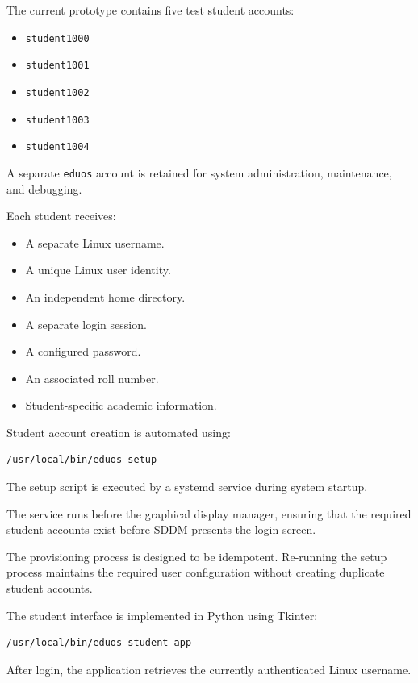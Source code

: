 \documentclass{tietreport}
\begin{document}
The current prototype contains five test student accounts:

\begin{itemize}
    \item \texttt{student1000}
    \item \texttt{student1001}
    \item \texttt{student1002}
    \item \texttt{student1003}
    \item \texttt{student1004}
\end{itemize}

A separate \texttt{eduos} account is retained for system
administration, maintenance, and debugging.

Each student receives:

\begin{itemize}
    \item A separate Linux username.
    \item A unique Linux user identity.
    \item An independent home directory.
    \item A separate login session.
    \item A configured password.
    \item An associated roll number.
    \item Student-specific academic information.
\end{itemize}

Student account creation is automated using:

\begin{verbatim}
/usr/local/bin/eduos-setup
\end{verbatim}

The setup script is executed by a systemd service during system
startup.

The service runs before the graphical display manager, ensuring that
the required student accounts exist before SDDM presents the login
screen.

The provisioning process is designed to be idempotent. Re-running
the setup process maintains the required user configuration without
creating duplicate student accounts.

The student interface is implemented in Python using Tkinter:

\begin{verbatim}
/usr/local/bin/eduos-student-app
\end{verbatim}

After login, the application retrieves the currently authenticated
Linux username.
\end{document}
